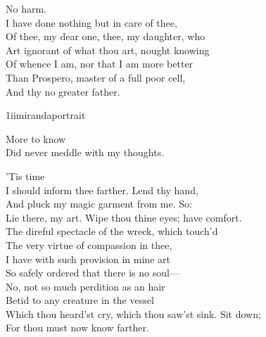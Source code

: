 	
\begin{verse_speech}[Prospero] 
No harm.\\
I have done nothing but in care of thee,\\
Of thee, my dear one, thee, my daughter, who\\
Art ignorant of what thou art, nought knowing\\
Of whence I am, nor that I am more better\\
Than Prospero, master of a full poor cell,\\
And thy no greater father.
\end{verse_speech}

\begin{pictures} %
	\begin{bwbigpic}
		[\picwidth]
		{1iimirandaportrait}
		{}
	\end{bwbigpic}
\end{pictures}

\begin{verse_speech}[Miranda] 
More to know\\
Did never meddle with my thoughts.
\end{verse_speech}

\begin{verse_speech}[Prospero] 
'Tis time\\
I should inform thee farther. Lend thy hand,\\
And pluck my magic garment from me. So:\\
Lie there, my art. Wipe thou thine eyes; have comfort.\\
The direful spectacle of the wreck, which touch'd\\
The very virtue of compassion in thee,\\
I have with such provision in mine art\\
So safely ordered that there is no soul—\\
No, not so much perdition as an hair\\
Betid to any creature in the vessel\\
Which thou heard'st cry, which thou saw'st sink. Sit down;\\
For thou must now know farther.
\end{verse_speech}

